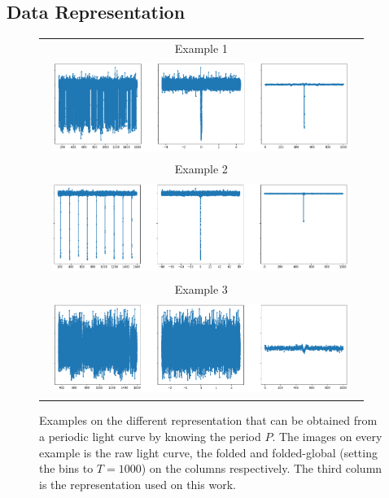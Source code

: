 \subsection{Data Representation}
\begin{figure}[!t]
    \centering
    \begin{tabular}{c}
        Example 1 \\
         \includegraphics[width=0.95\textwidth, height=3cm]{imgs/conf_ex.png}  \\
        Example 2 \\ 
         \includegraphics[width=0.95\textwidth, height=3cm]{imgs/narrow_ex.png} \\
         Example 3 \\ 
         \includegraphics[width=0.95\textwidth, height=3cm]{imgs/noisy_ex.png} 
    \end{tabular}
    \caption{Examples on the different representation that can be obtained from a periodic light curve by knowing the period $P$. The images on every example is the raw light curve, the folded and folded-global (setting the bins to $T=1000$) on the columns respectively. The third column is the representation used on this work.}
    \label{fig:representation_ex}
\end{figure}


